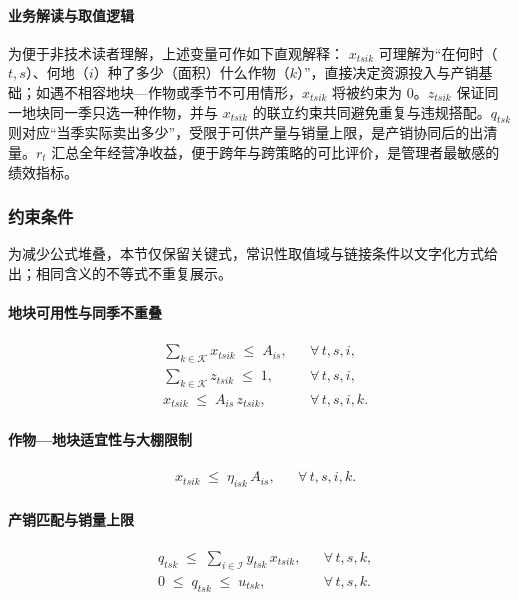 \paragraph{业务解读与取值逻辑}
为便于非技术读者理解，上述变量可作如下直观解释：
$x_{tsik}$ 可理解为“在何时（$t,s$）、何地（$i$）种了多少（面积）什么作物（$k$）”，直接决定资源投入与产销基础；如遇不相容地块—作物或季节不可用情形，$x_{tsik}$ 将被约束为 0。$z_{tsik}$ 保证同一地块同一季只选一种作物，并与 $x_{tsik}$ 的联立约束共同避免重复与违规搭配。$q_{tsk}$ 则对应“当季实际卖出多少”，受限于可供产量与销量上限，是产销协同后的出清量。$r_t$ 汇总全年经营净收益，便于跨年与跨策略的可比评价，是管理者最敏感的绩效指标。

\subsubsection{约束条件}
为减少公式堆叠，本节仅保留关键式，常识性取值域与链接条件以文字化方式给出；相同含义的不等式不重复展示。
\paragraph{地块可用性与同季不重叠}
\begin{align}
  &\sum_{k\in\mathcal{K}} x_{tsik} \;\le\; A_{is}, && \forall\,t,s,i, \label{cons:area}\\
  &\sum_{k\in\mathcal{K}} z_{tsik} \;\le\; 1, && \forall\,t,s,i, \label{cons:one-crop}\\
  &x_{tsik} \;\le\; A_{is}\,z_{tsik}, && \forall\,t,s,i,k. \label{cons:link}
\end{align}

\paragraph{作物—地块适宜性与大棚限制}
\begin{align}
  &x_{tsik} \;\le\; \eta_{isk}\,A_{is}, && \forall\,t,s,i,k. \label{cons:suitability}
\end{align}

\paragraph{产销匹配与销量上限}
\begin{align}
  &q_{tsk} \;\le\; \sum_{i\in\mathcal{I}} y_{tsk}\,x_{tsik}, && \forall\,t,s,k, \label{cons:sales-prod}\\
  &0 \;\le\; q_{tsk} \;\le\; u_{tsk}, && \forall\,t,s,k. \label{cons:sales-cap}
\end{align}

